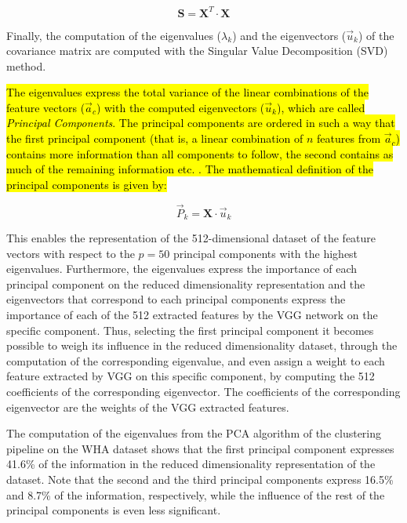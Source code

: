 \documentclass[authoryear,preprint,review,12pt, singleside]{elsarticle}
\begin{document}
\begin{equation*}
\textbf{S} = \textbf{X}^T \cdot \textbf{X}
\end{equation*}

Finally, the computation of the eigenvalues ($\lambda_k$) and the eigenvectors ($\vec{u}_k$) of the covariance matrix are computed with the Singular Value Decomposition (SVD) method. 

\hl{The eigenvalues express the total variance of the linear combinations of the feature vectors ($\vec{a}_c$) with the computed eigenvectors ($\vec{u}_k$), which are called \textit{Principal Components}. The principal components are ordered in such a way that the first principal component (that is, a linear combination of $n$ features from  $\vec{a}_c$) contains more information than all components to follow, the second contains as much of the remaining information etc. . The mathematical definition of the principal components is given by:}


\begin{equation*}
\vec{P}_k = \textbf{X} \cdot \vec{u}_k
\end{equation*}

This enables the representation of the 512-dimensional dataset of the feature vectors with respect to the $p=50$ principal components with the highest eigenvalues. Furthermore, the eigenvalues express the importance of each principal component on the reduced dimensionality representation and the eigenvectors that correspond to each principal components express the importance of each of the 512 extracted features by the VGG network on the specific component. Thus, selecting the first principal component it becomes possible to weigh its influence in the reduced dimensionality dataset, through the computation of the corresponding eigenvalue, and even assign a weight to each feature extracted by VGG on this specific component, by computing the 512 coefficients of the corresponding eigenvector. The coefficients of the corresponding eigenvector are the weights of the VGG extracted features.

The computation of the eigenvalues from the PCA algorithm of the clustering pipeline on the WHA dataset shows that the first principal component expresses 41.6\% of the information in the reduced dimensionality representation of the dataset. Note that the second and the third principal components express 16.5\% and 8.7\% of the information, respectively, while the influence of the rest of the principal components is even less significant.  
\end{document}
